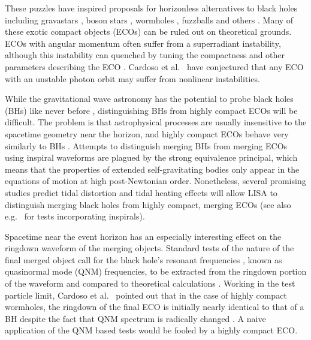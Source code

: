 \begin{refsection}
These puzzles have inspired proposals for horizonless alternatives to black holes including gravastars \cite{Mazur:2001fv}, boson stars \cite{Schunck:2003kk}, wormholes \cite{Morris:1988tu}, fuzzballs \cite{Mathur:2005zp} and others \cite{Barcelo:2010vc, Barcelo:2014cla,Holdom:2016nek}. 
Many of these exotic compact objects (ECOs) can be ruled out on theoretical grounds.
ECOs with angular momentum often suffer from a superradiant instability, although this instability can quenched by tuning the compactness and other parameters describing the ECO \cite{Maggio:2017ivp,Hod:2017cga}. Cardoso et al.~\cite{Cardoso:2014sna} have conjectured that any ECO with an unstable photon orbit may suffer from nonlinear instabilities.

While the gravitational wave astronomy has the potential to probe black holes (BHs) like never before \cite{Yagi:2016jml}, distinguishing BHs from highly compact ECOs will be difficult. 
The problem is that astrophysical processes are usually insensitive to the spacetime geometry near the horizon, and highly compact ECOs behave very similarly to BHs \cite{Abramowicz:2002vt}.
Attempts to distinguish merging BHs from merging ECOs using inspiral waveforms are plagued by the strong equivalence principal, which means that  the properties of extended self-gravitating bodies only appear in the  equations of motion at high post-Newtonian order. 
Nonetheless, several promising studies \cite{Porto:2016zng,Cardoso:2017cfl,Maselli:2017cmm} predict tidal distortion and tidal heating effects will allow LISA \cite{AmaroSeoane:2012km} to distinguish merging black holes from highly compact, merging ECOs (see also e.g.~\cite{Pani:2010em,Krishnendu:2017shb} for tests incorporating inspirals). 

Spacetime near the event horizon has an especially interesting effect on the ringdown waveform of the merging objects. 
Standard tests of the nature of the final merged object call for the black hole's resonant frequencies \cite{Nollert, Berti2009, Kokkotas:1999bd}, known as quasinormal mode (QNM) frequencies, to be extracted from the ringdown portion of the waveform and compared to theoretical calculations \cite{Dreyer2004,Berti:2005ys,Pani:2013pma,Berti:2016lat,Yang:2017zxs,Maselli:2017kvl}. Working in the test particle limit, Cardoso et al.~\cite{Cardoso:2016rao} pointed out that in the case of highly compact wormholes, the ringdown of the final ECO is initially nearly identical to that of a BH  despite the fact that QNM spectrum is radically changed \cite{Ching:1995rt, Nollert:1998ys,Pani:2009ss}. 
A naive application of the QNM based tests would be fooled by a highly compact ECO.   


\end{refsection}
